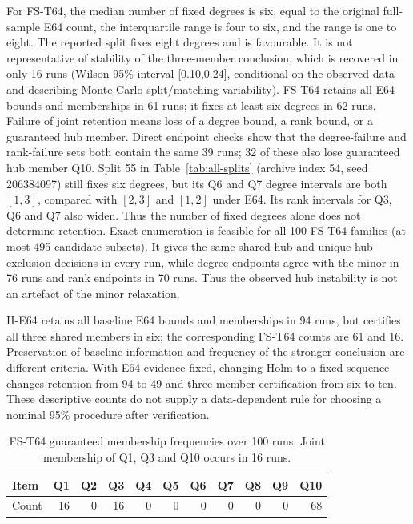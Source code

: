 For FS-T64, the median number of fixed degrees is six, equal to the original full-sample E64 count, the interquartile range is four to six, and the range is one to eight. The reported split fixes eight degrees and is favourable. It is not representative of stability of the three-member conclusion, which is recovered in only 16 runs (Wilson 95\% interval [0.10,0.24], conditional on the observed data and describing Monte Carlo split/matching variability). FS-T64 retains all E64 bounds and memberships in 61 runs; it fixes at least six degrees in 62 runs. Failure of joint retention means loss of a degree bound, a rank bound, or a guaranteed hub member. Direct endpoint checks show that the degree-failure and rank-failure sets both contain the same 39 runs; 32 of these also lose guaranteed hub member Q10. Split 55 in Table~\ref{tab:all-splits} (archive index 54, seed 206384097) still fixes six degrees, but its Q6 and Q7 degree intervals are both $[1,3]$, compared with $[2,3]$ and $[1,2]$ under E64. Its rank intervals for Q3, Q6 and Q7 also widen. Thus the number of fixed degrees alone does not determine retention. Exact enumeration is feasible for all 100 FS-T64 families (at most 495 candidate subsets). It gives the same shared-hub and unique-hub-exclusion decisions in every run, while degree endpoints agree with the minor in 76 runs and rank endpoints in 70 runs. Thus the observed hub instability is not an artefact of the minor relaxation.

H-E64 retains all baseline E64 bounds and memberships in 94 runs, but certifies all three shared members in six; the corresponding FS-T64 counts are 61 and 16. Preservation of baseline information and frequency of the stronger conclusion are different criteria. With E64 evidence fixed, changing Holm to a fixed sequence changes retention from 94 to 49 and three-member certification from six to ten. These descriptive counts do not supply a data-dependent rule for choosing a nominal 95\% procedure after verification.

\begin{table}[htbp]\centering\small\caption{FS-T64 guaranteed membership frequencies over 100 runs. Joint membership of Q1, Q3 and Q10 occurs in 16 runs.}\label{tab:split-items}\begin{tabular}{lrrrrrrrrrr}\toprule Item & Q1 & Q2 & Q3 & Q4 & Q5 & Q6 & Q7 & Q8 & Q9 & Q10\\\midrule

Count & 16 & 0 & 16 & 0 & 0 & 0 & 0 & 0 & 0 & 68\\\bottomrule\end{tabular}\end{table}

